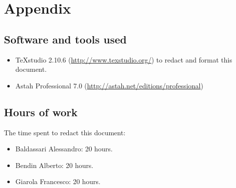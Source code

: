 \documentclass[a4paper,11pt]{report} %
\begin{document}
	\section{Appendix}
	
	\subsection{Software and tools used}
	\begin{itemize}
		\item TeXstudio 2.10.6 (\href{http://www.texstudio.org/}{http://www.texstudio.org/}) to redact and format this document.
		\item Astah Professional 7.0 (\href{http://astah.net/editions/professional}{http://astah.net/editions/professional}) 
	\end{itemize}
	
	\subsection{Hours of work} The time spent to redact this document:
	\begin{itemize}
		\item Baldassari Alessandro: 20 hours.
		\item Bendin Alberto: 20 hours.
		\item Giarola Francesco: 20 hours.
	\end{itemize}
\end{document}
